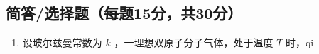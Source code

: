 
\subsection{简答/选择题（每题15分，共30分）}
\begin{enumerate}
\item 设玻尔兹曼常数为 $k$ ，一理想双原子分子气体，处于温度 $T$ 时，qi
\end{enumerate}